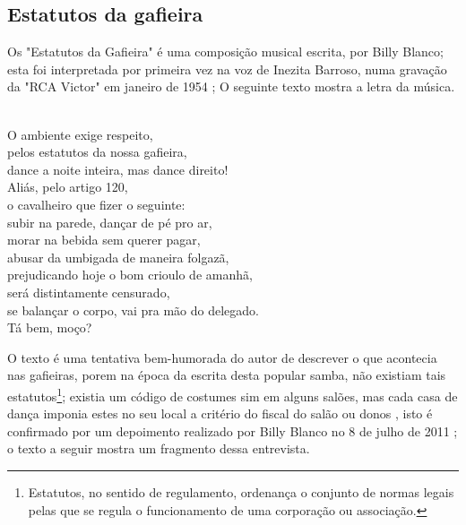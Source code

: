 \subsection{Estatutos da gafieira}
Os "Estatutos da Gafieira" é uma composição musical escrita, por Billy Blanco;
esta foi interpretada por primeira vez na voz de Inezita Barroso, 
numa gravação da "RCA Victor" em janeiro de 1954 \cite{musicaestatuto};
O seguinte texto mostra a letra da música.
\begin{tcolorbox}[colback=lowgray,colframe=lowgray]%
\\
O ambiente exige respeito,\\
pelos estatutos da nossa gafieira,\\
dance a noite inteira, mas dance direito!\\
Aliás, pelo artigo 120,\\
o cavalheiro que fizer o seguinte:\\
subir na parede, dançar de pé pro ar,\\
morar na bebida sem querer pagar,\\
abusar da umbigada de maneira folgazã,\\
prejudicando hoje o bom crioulo de amanhã,\\
será distintamente censurado,\\
se balançar o corpo, vai pra mão do delegado.\\
Tá bem, moço?\\
\end{tcolorbox}
O texto é uma tentativa bem-humorada do autor de descrever o que acontecia 
nas gafieiras, porem na época da escrita desta popular samba, não
existiam tais estatutos\footnote{Estatutos, no sentido de regulamento, 
ordenança o conjunto de normas legais pelas que se regula o funcionamento de uma corporação ou associação.};
existia um código de costumes sim \cite[pp. 13]{respeitojournalbrasil1} em alguns salões, 
mas cada casa de dança imponia estes no seu local a critério do fiscal do salão ou donos \cite[pp. 10]{simoesjournalbrasil1} \cite{entrevistajuliojournalbrasil1} \cite[pp. 37]{gafieirajournalmanchete},
isto é confirmado por um depoimento realizado por 
Billy Blanco no 8 de julho de 2011 \cite{depoimentobilly}; o texto a seguir
mostra um fragmento dessa entrevista.

